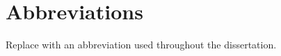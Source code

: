\chapter*{Abbreviations}
{}

\begin{description}[style=multiline,leftmargin=35mm]
  \item[ABC] Replace with an abbreviation used throughout the dissertation. %
\end{description}
